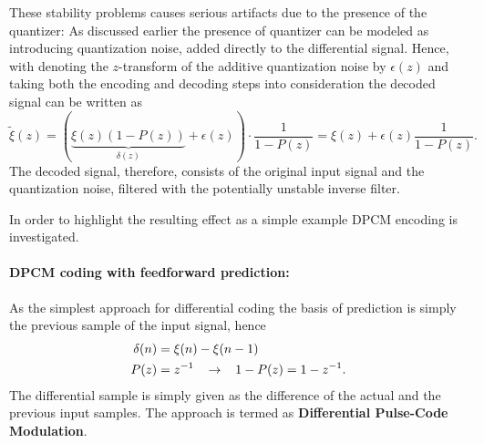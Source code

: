 These stability problems causes serious artifacts due to the presence of the quantizer:
As discussed earlier the presence of quantizer can be modeled as introducing quantization noise, added directly to the differential signal.
Hence, with denoting the $z$-transform of the additive quantization noise by $\epsilon(z)$ and taking both the encoding and decoding steps into consideration the decoded signal can be written as
\begin{equation}
\tilde{\xi}(z) = \left( \underbrace{\xi(z) \left( 1 - P(z) \right)}_{\delta(z)} + \epsilon(z) \right) \cdot \frac{1}{1 - P(z) }
=
\xi(z) + \epsilon(z) \frac{1}{1-P(z)}.
\label{eq:reproduced_signal}
\end{equation}
The decoded signal, therefore, consists of the original input signal and the quantization noise, filtered with the potentially unstable inverse filter.

In order to highlight the resulting effect as a simple example DPCM encoding is investigated.

\paragraph*{DPCM coding with feedforward prediction:\\}
As the simplest approach for differential coding the basis of prediction is simply the previous sample of the input signal, hence 
\begin{align}
\begin{split}
\delta(n) &= \xi(n)-\xi(n-1) \\ P(z) &= z^{-1} \hspace{3mm} \rightarrow \hspace{3mm} 1 - P(z) = 1 - z^{-1}.
\end{split}
\label{Eq:temp1}
\end{align}
The differential sample is simply given as the difference of the actual and the previous input samples.
The approach is termed as \textbf{Differential Pulse-Code Modulation}.

